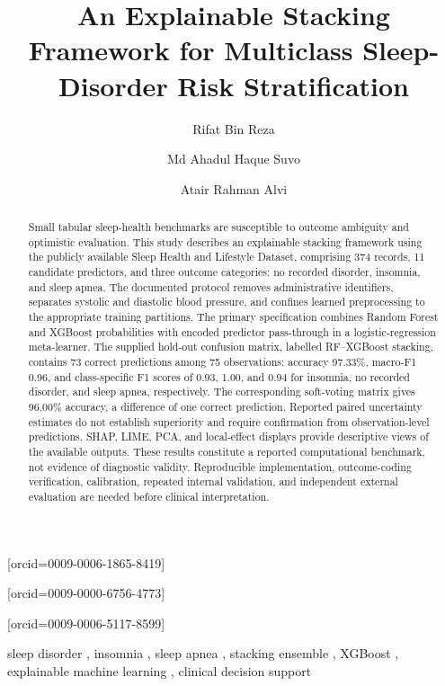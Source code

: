 \documentclass[a4paper,fleqn]{cas-dc}
\begin{document}
\raggedbottom
\shorttitle{}
\shortauthors{}
\title[mode=title]{An Explainable Stacking Framework for Multiclass Sleep-Disorder Risk Stratification}
\author[1]{Rifat Bin Reza}[orcid=0009-0006-1865-8419]
\cormark[1]
\author[2]{Md Ahadul Haque Suvo}[orcid=0009-0000-6756-4773]
\author[1]{Atair Rahman Alvi}[orcid=0009-0006-5117-8599]
\address[1]{BSRM School of Engineering, Department of Electrical and Electronics Engineering, Brac University, Dhaka, Bangladesh\label{affa}}
\address[2]{Aviation and Aerospace University, Department of Avionics Engineering, Dhaka, Bangladesh}
\begin{abstract}
Small tabular sleep-health benchmarks are susceptible to outcome ambiguity and optimistic evaluation. This study describes an explainable stacking framework using the publicly available Sleep Health and Lifestyle Dataset, comprising 374 records, 11 candidate predictors, and three outcome categories: no recorded disorder, insomnia, and sleep apnea. The documented protocol removes administrative identifiers, separates systolic and diastolic blood pressure, and confines learned preprocessing to the appropriate training partitions. The primary specification combines Random Forest and XGBoost probabilities with encoded predictor pass-through in a logistic-regression meta-learner. The supplied hold-out confusion matrix, labelled RF--XGBoost stacking, contains 73 correct predictions among 75 observations: accuracy 97.33\%, macro-F1 0.96, and class-specific F1 scores of 0.93, 1.00, and 0.94 for insomnia, no recorded disorder, and sleep apnea, respectively. The corresponding soft-voting matrix gives 96.00\% accuracy, a difference of one correct prediction. Reported paired uncertainty estimates do not establish superiority and require confirmation from observation-level predictions. SHAP, LIME, PCA, and local-effect displays provide descriptive views of the available outputs. These results constitute a reported computational benchmark, not evidence of diagnostic validity. Reproducible implementation, outcome-coding verification, calibration, repeated internal validation, and independent external evaluation are needed before clinical interpretation.
\end{abstract}
\begin{keywords}
sleep disorder \sep
insomnia \sep
sleep apnea \sep
stacking ensemble \sep
XGBoost \sep
explainable machine learning \sep
clinical decision support
\end{keywords}
\end{document}
